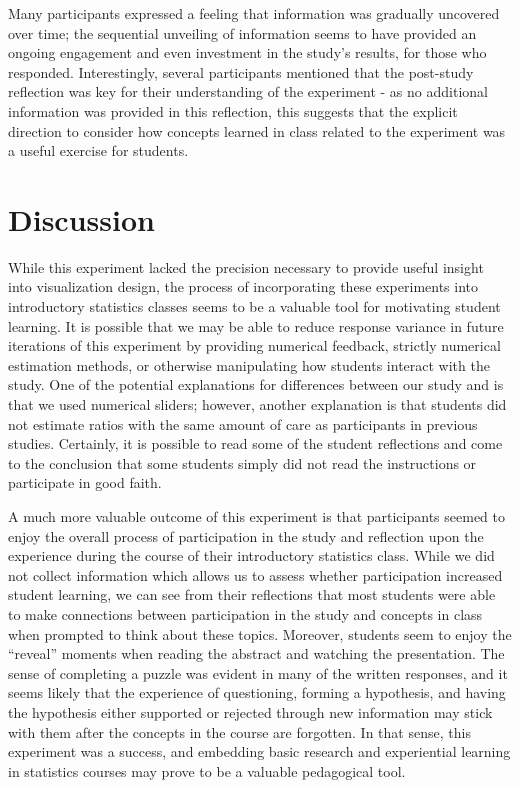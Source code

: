 \documentclass[runningheads
]{llncs}
\begin{document}
Many participants expressed a feeling that information was gradually
uncovered over time; the sequential unveiling of information seems to
have provided an ongoing engagement and even investment in the study's
results, for those who responded. Interestingly, several participants
mentioned that the post-study reflection was key for their understanding
of the experiment - as no additional information was provided in this
reflection, this suggests that the explicit direction to consider how
concepts learned in class related to the experiment was a useful
exercise for students.

\hypertarget{discussion}{%
\section{Discussion}\label{discussion}}

While this experiment lacked the precision necessary to provide useful
insight into visualization design, the process of incorporating these
experiments into introductory statistics classes seems to be a valuable
tool for motivating student learning. It is possible that we may be able
to reduce response variance in future iterations of this experiment by
providing numerical feedback, strictly numerical estimation methods, or
otherwise manipulating how students interact with the study. One of the
potential explanations for differences between our study and
\textcite{clevelandGraphicalPerceptionTheory1984} is that we used
numerical sliders; however, another explanation is that students did not
estimate ratios with the same amount of care as participants in previous
studies. Certainly, it is possible to read some of the student
reflections and come to the conclusion that some students simply did not
read the instructions or participate in good faith.

A much more valuable outcome of this experiment is that participants
seemed to enjoy the overall process of participation in the study and
reflection upon the experience during the course of their introductory
statistics class. While we did not collect information which allows us
to assess whether participation increased student learning, we can see
from their reflections that most students were able to make connections
between participation in the study and concepts in class when prompted
to think about these topics. Moreover, students seem to enjoy the
``reveal'' moments when reading the abstract and watching the
presentation. The sense of completing a puzzle was evident in many of
the written responses, and it seems likely that the experience of
questioning, forming a hypothesis, and having the hypothesis either
supported or rejected through new information may stick with them after
the concepts in the course are forgotten. In that sense, this experiment
was a success, and embedding basic research and experiential learning in
statistics courses may prove to be a valuable pedagogical tool.


\printbibliography[title=References]
\end{document}
